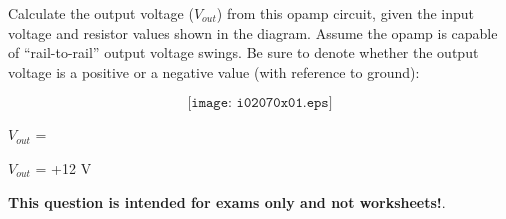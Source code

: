 

Calculate the output voltage ($V_{out}$) from this opamp circuit, given the input voltage and resistor values shown in the diagram.  Assume the opamp is capable of ``rail-to-rail'' output voltage swings.  Be sure to denote whether the output voltage is a positive or a negative value (with reference to ground):

$$\texttt{[image: i02070x01.eps]}$$

$V_{out}$ = 







$V_{out}$ = +12 V







{\bf This question is intended for exams only and not worksheets!}.


